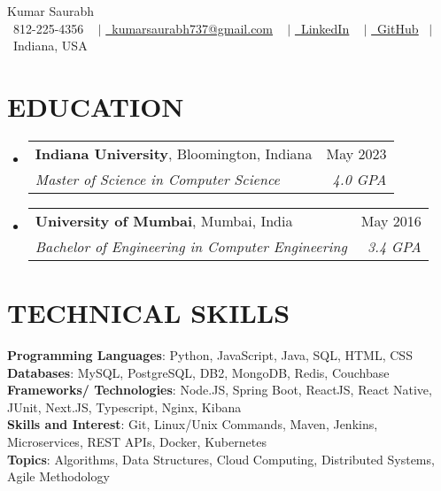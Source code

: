\documentclass[letterpaper,11pt]{article}
\makeatletter
\newcommand{\resumeSubheading}[4]{
  \vspace{-2pt}\item
    \begin{tabular*}{1.0\textwidth}[t]{l@{\extracolsep{\fill}}r}
      {#1} & {\small #2} \\
      \textit{\small#3} & \textit{\small #4} \\
    \end{tabular*}\vspace{-7pt}
}
\newcommand{\resumeSubHeadingListStart}{\begin{itemize}[leftmargin=0.0in, label={}]}
\newcommand{\resumeSubHeadingListEnd}{\end{itemize}}
\makeatother
\begin{document}
\begin{center}
    {\huge  Kumar Saurabh} \\ \vspace{5pt}
    \small \raisebox{-0.1\height}\ 812-225-4356 ~ $|$ \href{mailto:kumarsaurabh737@gmail.com}{\raisebox{-0.2\height}\  \underline{kumarsaurabh737@gmail.com}} ~ $|$
    \href{https://www.linkedin.com/in/ksaurabh737/}{\raisebox{-0.2\height}\ \underline{LinkedIn}}  ~ $|$
    \href{https://github.com/saurabh737}{\raisebox{-0.2\height}\ \underline{GitHub}}~ $|$
    \small \raisebox{-0.1\height}\ Indiana, USA 
    \vspace{-8pt}
\end{center}


\section{EDUCATION}
  \resumeSubHeadingListStart
    \resumeSubheading
      {\textbf{Indiana University}, Bloomington, Indiana}{May 2023}
      {Master of Science in Computer Science}{4.0 GPA}
    \resumeSubheading
      {\textbf{University of Mumbai}, Mumbai, India}{May 2016}
      {Bachelor of Engineering in Computer Engineering}{3.4 GPA}
  \resumeSubHeadingListEnd
  



%
\section{TECHNICAL SKILLS}
 \begin{itemize}[leftmargin=0in, label={}]
    \small{\item{
     \textbf{Programming Languages}{: Python, JavaScript, Java, SQL, HTML, CSS} \\
     \textbf{Databases}{: MySQL, PostgreSQL, DB2, MongoDB, Redis, Couchbase} \\
     \textbf{Frameworks/ Technologies}{: Node.JS, Spring Boot, ReactJS, React Native, JUnit, Next.JS, Typescript, Nginx, Kibana} \\ 
     \textbf{Skills and Interest}{: Git, Linux/Unix Commands, Maven, Jenkins, Microservices, REST APIs, Docker, Kubernetes}\\
     \textbf{Topics}{: Algorithms, Data Structures, Cloud Computing, Distributed Systems, Agile Methodology}\\
     
     
    }}
 \end{itemize}
 \vspace{-14pt}
\end{document}

